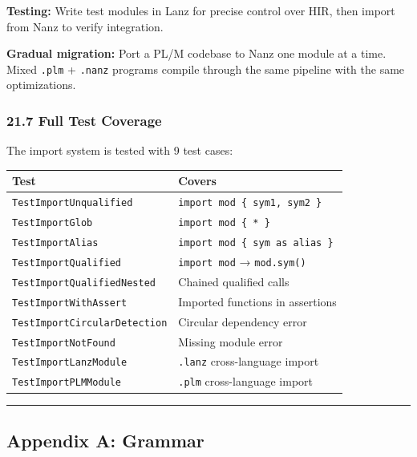 \documentclass[
  11pt,
]{article}
\begin{document}
\textbf{Testing:} Write test modules in Lanz for precise control over
HIR, then import from Nanz to verify integration.

\textbf{Gradual migration:} Port a PL/M codebase to Nanz one module at a
time. Mixed \texttt{.plm} + \texttt{.nanz} programs compile through the
same pipeline with the same optimizations.

\hypertarget{full-test-coverage}{%
\subsubsection{21.7 Full Test Coverage}\label{full-test-coverage}}

The import system is tested with 9 test cases:

\begin{longtable}[]{@{}ll@{}}
\toprule\noalign{}
Test & Covers \\
\midrule\noalign{}
\endhead
\bottomrule\noalign{}
\endlastfoot
\texttt{TestImportUnqualified} &
\texttt{import\ mod\ \{\ sym1,\ sym2\ \}} \\
\texttt{TestImportGlob} & \texttt{import\ mod\ \{\ *\ \}} \\
\texttt{TestImportAlias} &
\texttt{import\ mod\ \{\ sym\ as\ alias\ \}} \\
\texttt{TestImportQualified} & \texttt{import\ mod} →
\texttt{mod.sym()} \\
\texttt{TestImportQualifiedNested} & Chained qualified calls \\
\texttt{TestImportWithAssert} & Imported functions in assertions \\
\texttt{TestImportCircularDetection} & Circular dependency error \\
\texttt{TestImportNotFound} & Missing module error \\
\texttt{TestImportLanzModule} & \texttt{.lanz} cross-language import \\
\texttt{TestImportPLMModule} & \texttt{.plm} cross-language import \\
\end{longtable}

\begin{center}\rule{0.5\linewidth}{0.5pt}\end{center}

\hypertarget{appendix-a-grammar}{%
\subsection{Appendix A: Grammar}\label{appendix-a-grammar}}
\end{document}

